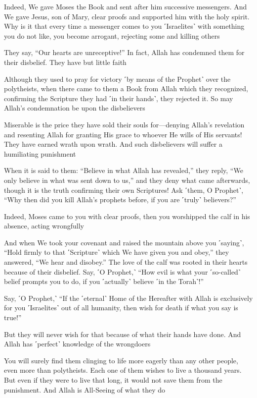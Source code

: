 Indeed, We gave Moses the Book and sent after him successive messengers. And We gave Jesus, son of Mary, clear proofs and supported him with the holy spirit. Why is it that every time a messenger comes to you ˹Israelites˺ with something you do not like, you become arrogant, rejecting some and killing others

They say, “Our hearts are unreceptive!” In fact, Allah has condemned them for their disbelief. They have but little faith

Although they used to pray for victory ˹by means of the Prophet˺ over the polytheists, when there came to them a Book from Allah which they recognized, confirming the Scripture they had ˹in their hands˺, they rejected it. So may Allah’s condemnation be upon the disbelievers

Miserable is the price they have sold their souls for—denying Allah’s revelation and resenting Allah for granting His grace to whoever He wills of His servants! They have earned wrath upon wrath. And such disbelievers will suffer a humiliating punishment

When it is said to them: “Believe in what Allah has revealed,” they reply, “We only believe in what was sent down to us,” and they deny what came afterwards, though it is the truth confirming their own Scriptures! Ask ˹them, O Prophet˺, “Why then did you kill Allah’s prophets before, if you are ˹truly˺ believers?”

Indeed, Moses came to you with clear proofs, then you worshipped the calf in his absence, acting wrongfully

And when We took your covenant and raised the mountain above you ˹saying˺, “Hold firmly to that ˹Scripture˺ which We have given you and obey,” they answered, “We hear and disobey.” The love of the calf was rooted in their hearts because of their disbelief. Say, ˹O Prophet,˺ “How evil is what your ˹so-called˺ belief prompts you to do, if you ˹actually˺ believe ˹in the Torah˺!”

Say, ˹O Prophet,˺ “If the ˹eternal˺ Home of the Hereafter with Allah is exclusively for you ˹Israelites˺ out of all humanity, then wish for death if what you say is true!”

But they will never wish for that because of what their hands have done. And Allah has ˹perfect˺ knowledge of the wrongdoers

You will surely find them clinging to life more eagerly than any other people, even more than polytheists. Each one of them wishes to live a thousand years. But even if they were to live that long, it would not save them from the punishment. And Allah is All-Seeing of what they do

